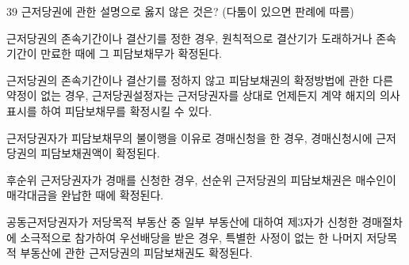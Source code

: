 \begin{question}{39}
근저당권에 관한 설명으로 옳지 않은 것은? (다툼이 있으면 판례에 따름)
\begin{choices}
  \item 근저당권의 존속기간이나 결산기를 정한 경우, 원칙적으로 결산기가 도래하거나 존속기간이 만료한 때에 그 피담보채무가 확정된다.
  \item 근저당권의 존속기간이나 결산기를 정하지 않고 피담보채권의 확정방법에 관한 다른 약정이 없는 경우, 근저당권설정자는 근저당권자를 상대로 언제든지 계약 해지의 의사표시를 하여 피담보채무를 확정시킬 수 있다.
  \item 근저당권자가 피담보채무의 불이행을 이유로 경매신청을 한 경우, 경매신청시에 근저당권의 피담보채권액이 확정된다.
  \item 후순위 근저당권자가 경매를 신청한 경우, 선순위 근저당권의 피담보채권은 매수인이 매각대금을 완납한 때에 확정된다.
  \item 공동근저당권자가 저당목적 부동산 중 일부 부동산에 대하여 제3자가 신청한 경매절차에 소극적으로 참가하여 우선배당을 받은 경우, 특별한 사정이 없는 한 나머지 저당목적 부동산에 관한 근저당권의 피담보채권도 확정된다.
\end{choices}
\end{question}

